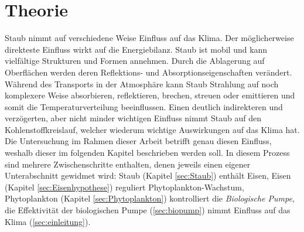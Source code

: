 \documentclass[12pt,a4paper,onecolumn,headheight=30pt]{scrartcl}
\begin{document}
\section{Theorie} \label{sec:Theorie}
Staub nimmt auf verschiedene Weise Einfluss auf das Klima. Der möglicherweise direkteste Einfluss wirkt auf die Energiebilanz. Staub ist mobil und kann vielfältige Strukturen und Formen annehmen. Durch die Ablagerung auf Oberflächen werden deren Reflektions- und Absorptionseigenschaften verändert. Während des Transports in der Atmosphäre kann Staub Strahlung auf noch komplexere Weise absorbieren, reflektieren, brechen, streuen oder emittieren \citep{Shao.2011} und somit die Temperaturverteilung beeinflussen. Einen deutlich indirekteren und verzögerten, aber nicht minder wichtigen Einfluss nimmt Staub auf den Kohlenstoffkreislauf, welcher wiederum wichtige Auswirkungen auf das Klima hat. Die Untersuchung im Rahmen dieser Arbeit betrifft genau diesen Einfluss, weshalb dieser im folgenden Kapitel beschrieben werden soll. In diesem Prozess sind mehrere Zwischenschritte enthalten, denen jeweils einen eigener Unterabschnitt gewidmet wird: Staub (Kapitel \ref{sec:Staub}) enthält Eisen, Eisen (Kapitel \ref{sec:Eisenhypothese}) reguliert Phytoplankton-Wachstum, Phytoplankton (Kapitel \ref{sec:Phytoplankton}) kontrolliert die \textit{Biologische Pumpe}, die Effektivität der biologischen Pumpe (\ref{sec:biopump}) nimmt Einfluss auf das Klima (\ref{sec:einleitung}).
\end{document}

